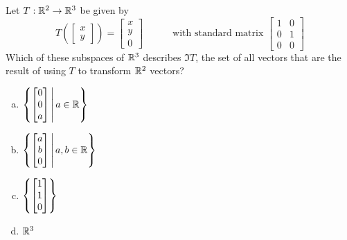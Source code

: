 \begin{applicationActivities}
\begin{activity}{5}
Let $T: \mathbb{R}^2 \rightarrow \mathbb{R}^3$ be given by
\[
  T\left(\begin{bmatrix}x \\ y \end{bmatrix} \right)
    =
  \begin{bmatrix} x \\ y \\ 0 \end{bmatrix}
    \hspace{3em}
    \text{with standard matrix }
  \begin{bmatrix} 1 & 0 \\ 0 & 1 \\ 0 & 0 \end{bmatrix}
\]
Which of these subspaces of \(\mathbb{R}^3\) describes \(\Im T\),
the set of all vectors that are the result of using \(T\) to transform
\(\mathbb{R}^2\) vectors?
\begin{enumerate}[a)]
\item \(\left\{\begin{bmatrix}0 \\ 0\\a\end{bmatrix}\,\middle|\,a\in\mathbb{R}\right\}\)
\item \(\left\{\begin{bmatrix}a \\ b\\0\end{bmatrix}\,\middle|\,a,b\in\mathbb{R}\right\}\)
\item \(\left\{\begin{bmatrix}1\\1\\0\end{bmatrix}\right\}\)
\item \(\mathbb{R}^3\)
\end{enumerate}
\end{activity}


\end{applicationActivities}
